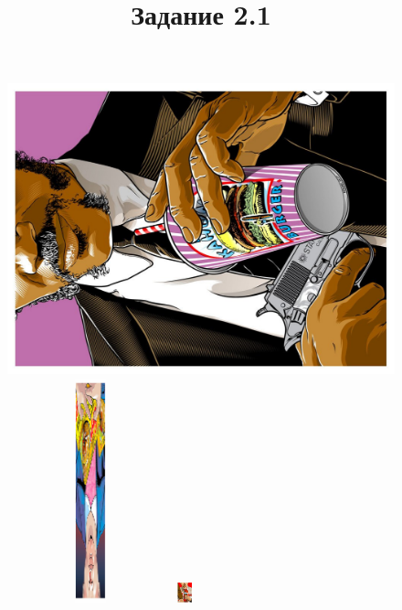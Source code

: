\documentclass[12pt, a4paper]{article}
\title{Задание 2.1}
\date{}
\begin{document}
 
\maketitle
\begin{figure}[h!]
\begin{minipage}[h!]{0.28\linewidth} 
\includegraphics[scale=0.18,angle=270]{pop1.pdf}
\end{minipage}
\hfill
\begin{minipage}[h!]{0.28\linewidth}
\includegraphics[height=6.5cm,width=4.8cm,angle=180]{pop2.pdf}
\end{minipage}
\hfill
\begin{minipage}[h!]{0.28\linewidth}
\includegraphics[scale=18]{pop3.pdf}
\end{minipage}
\hfill
\begin{minipage}[h!]{0.28\linewidth} 

\end{minipage}
\end{figure}
\end{document}

